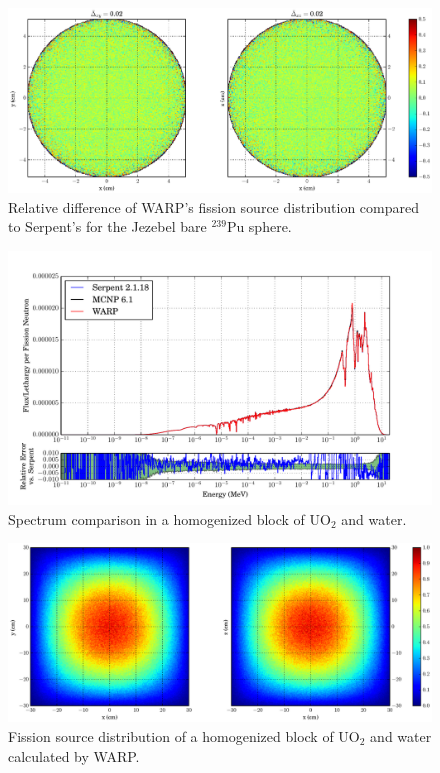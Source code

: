 \begin{figure}[h!]
\centering
\includegraphics[width=\textwidth,trim= 5cm 0cm 7cm 0cm]{graphics/finalresults/godiva_fiss_diff-6.eps}
\caption{Relative difference of WARP's fission source distribution compared to Serpent's for the Jezebel bare $^{239}$Pu sphere. \label{godiva_fiss_diff} }
\end{figure}

\begin{figure}[h!] 
\centering
\includegraphics[width=\textwidth,trim= 1cm 0cm 1cm 0cm]{graphics/finalresults/homfuel_spec-6.pdf}
\caption{Spectrum comparison in a homogenized block of UO$_2$ and water. \label{homfuel_spec} }
\end{figure}

\begin{figure}[h!]
\centering
\includegraphics[width=\textwidth,trim= 5cm 0cm 7cm 0cm]{graphics/finalresults/homfuel_fiss-6.eps}
\caption{Fission source distribution of a homogenized block of UO$_2$ and water calculated by WARP. \label{homfuel_fiss} }
\end{figure}

